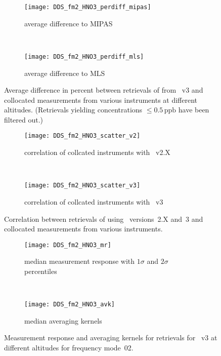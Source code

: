 
\begin{figure}[htpb]
    \centering
    \begin{subfigure}[b]{0.49\textwidth}
        \texttt{[image: DDS\_fm2\_HNO3\_perdiff\_mipas]}
        \caption{average difference to MIPAS}
        \label{fig:fm02:HNO3:profiles:MIPAS}
    \end{subfigure}
    \,
    \begin{subfigure}[b]{0.49\textwidth}
        \texttt{[image: DDS\_fm2\_HNO3\_perdiff\_mls]}
        \caption{average difference to MLS}
        \label{fig:fm02:HNO3:profiles:MLS}
    \end{subfigure}
    \caption{Average difference in percent between retrievals of 
    from \smr~v3 and collocated measurements from various instruments at
    different altitudes. (Retrievals yielding concentrations
    $\leq 0.5\,\mathrm{ppb}$ have been filtered out.)}

    \label{fig:fm02:HNO3:profiles}
\end{figure}

\begin{figure}[htpb]
    \centering
    \begin{subfigure}[b]{0.49\textwidth}
        \texttt{[image: DDS\_fm2\_HNO3\_scatter\_v2]}
        \caption{correlation of collcated instruments with \smr~v2.X}
        \label{fig:fm02:HNO3:scatter:v2}
    \end{subfigure}
    \,
    \begin{subfigure}[b]{0.49\textwidth}
        \texttt{[image: DDS\_fm2\_HNO3\_scatter\_v3]}
        \caption{correlation of collcated instruments with \smr~v3}
        \label{fig:fm02:HNO3:scatter:v3}
    \end{subfigure}
    \caption{Correlation between retrievals of  using \smr\
    versions~2.X and~3 and collocated measurements from various instruments.}
    \label{fig:fm02:HNO3:scatter}
\end{figure}

\begin{figure}[htpb]
    \centering
    \begin{subfigure}[b]{0.49\textwidth}
        \texttt{[image: DDS\_fm2\_HNO3\_mr]}
        \caption{median measurement response with $1\sigma$ and $2\sigma$
        percentiles}
        \label{fig:fm02:HNO3:mr}
    \end{subfigure}
    \,
    \begin{subfigure}[b]{0.49\textwidth}
        \texttt{[image: DDS\_fm2\_HNO3\_avk]}
        \caption{median averaging kernels}
        \label{fig:fm02:HNO3:avk}
    \end{subfigure}
    \caption{Measurement response and averaging kernels for 
    retrievals for \smr~v3 at different altitudes for frequency mode~02.}
    \label{fig:fm02:HNO3:mr_avk}
\end{figure}

